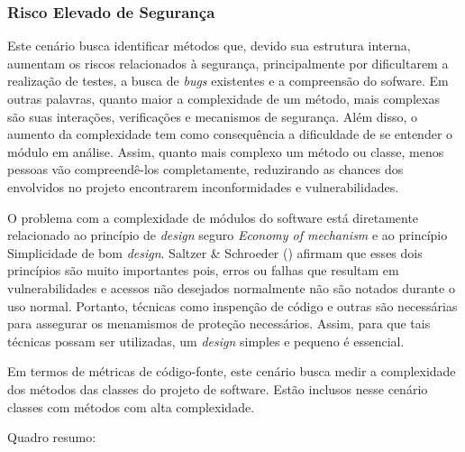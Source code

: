 \subsubsection{Risco Elevado de Segurança}

Este cenário busca identificar métodos que, devido sua estrutura interna, aumentam os riscos relacionados à segurança, principalmente por dificultarem a realização de testes, a busca de \emph{bugs} existentes e a compreensão do sofware. Em outras palavras, quanto maior a complexidade de um método, mais complexas são suas interações, verificações e mecanismos de segurança. Além disso, o aumento da complexidade tem como consequência a dificuldade de se entender o módulo em análise. Assim, quanto mais complexo um método ou classe, menos pessoas vão compreendê-los completamente, reduzirando as chances dos envolvidos no projeto encontrarem inconformidades e vulnerabilidades.

%

O problema com a complexidade de módulos do software está diretamente relacionado ao princípio de \emph{design} seguro \emph{Economy of mechanism} e ao princípio Simplicidade de bom \emph{design}. Saltzer \& Schroeder (\citeyear{schroeder1975}) afirmam que esses dois princípios são muito importantes pois, erros ou falhas que resultam em vulnerabilidades e acessos não desejados normalmente não são notados durante o uso normal. Portanto, técnicas como inspenção de código e outras são necessárias para assegurar os menamismos de proteção necessários. Assim, para que tais técnicas possam ser utilizadas, um \emph{design} simples e pequeno é essencial.

%

Em termos de métricas de código-fonte, este cenário busca medir a complexidade dos métodos das classes do projeto de software. Estão inclusos nesse cenário classes com métodos com alta complexidade. 

%

Quadro resumo:

